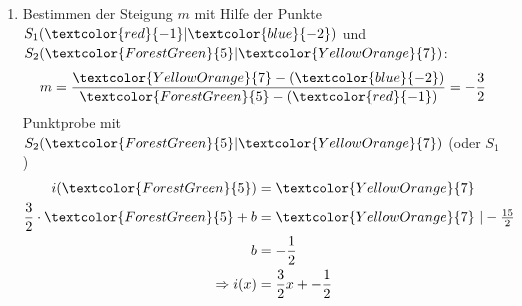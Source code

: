 \begin{Answer}[ref=punktprobeA2]
\begin{minipage}[t]{0.5\textwidth}
\begin{enumerate}[label=\alph*)]
			\item Bestimmen der Steigung \(m\) mit Hilfe der Punkte \(S_1(\textcolor{red}{-1}\vert\textcolor{blue}{-2})\) und \(S_2(\textcolor{ForestGreen}{5}\vert\textcolor{YellowOrange}{7})\):
			\begin{align*}
				m=\dfrac{\textcolor{YellowOrange}{7}-\left(\textcolor{blue}{-2}\right)}{\textcolor{ForestGreen}{5}-\left(\textcolor{red}{-1}\right)}=-\dfrac{3}{2}
			\end{align*}
			Punktprobe mit \(S_2(\textcolor{ForestGreen}{5}\vert\textcolor{YellowOrange}{7})\) (oder \(S_1\))
			\begin{align*}
				i(\textcolor{ForestGreen}{5})&=\textcolor{YellowOrange}{7}\\
				\dfrac{3}{2}\cdot\textcolor{ForestGreen}{5}+b&=\textcolor{YellowOrange}{7}\ \vert -\tfrac{15}{2}\\
				b&=-\dfrac{1}{2}\\
				\Rightarrow i(x)&=\dfrac{3}{2}x+-\dfrac{1}{2}
			\end{align*}
		\end{enumerate}
	\end{minipage}%
\end{Answer}